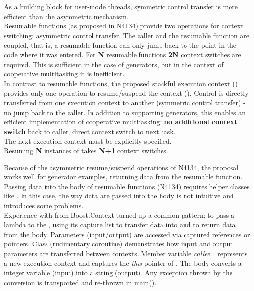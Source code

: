 As a building block for user-mode threads, symmetric control transfer is more
efficient than the asymmetric mechanism.\\
\newline
Resumable functions (as proposed in N4134\cite{N4134}) provide two operations
for context switching: asymmetric control transfer. The caller and the
resumable function are coupled, that is, a resumable function can only jump back
to the point in the code where it was entered.
For {\bfseries N} resumable functions {\bfseries 2N} context switches are
required. This is sufficient in the case of generators, but in the context of
cooperative multitasking it is inefficient.\\
\newline
In contrast to resumable functions, the proposed stackful execution context
(\ectx) provides only one operation to resume/suspend the context (\ectxop).
Control is directly transferred from one execution context to
another (symmetric control transfer) - no jump back to the caller. In addition
to supporting generators, this enables an efficient implementation of
cooperative multitasking: {\bfseries no additional context switch} back to
caller, direct context switch to next task.\\
The next execution context must be explicitly specified.\\
\newline
{}
Resuming {\bfseries N} instances of \ectx takes {\bfseries N+1} context
switches.

Because of the asymmetric resume/suspend operations of N4134, the proposal
works well for generator examples, returning data from the resumable
function.\\
\newline
Passing data into the body of resumable functions (N4134) requires helper
classes like \channel.
In this case, the way data are passed into the body is not intuitive and
introduces some problems.\\
\newline
Experience with  from Boost.Context\cite{bcontext}
turned up a common pattern: to pass a lambda to the ,
using its capture list to transfer data into and to return data from the
body. Parameters (input/output) are accessed via captured references or
pointers.
Class  (rudimentary coroutine) demonstrates how input and output
parameters are transferred between contexts. Member variable
\emph{callee\_} represents a new execution context and captures the
\emph{this}-pointer of . The body converts a integer variable (input)
into a string (output). Any exception thrown by the conversion is transported
and re-thrown in main().

